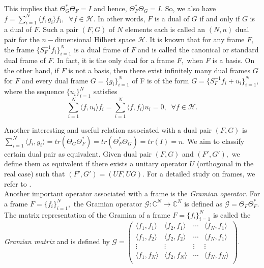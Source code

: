 \documentclass[final,1p,times]{elsarticle}
\begin{document}
	This implies that $\Theta_{G}^* \Theta_{F} = I$ and hence, $\Theta_{F}^* \Theta_{G} = I.$ So, we also have $	f = \sum_{i=1}^N\langle f,g_i \rangle f_i,  \;\;   \forall f\in \mathcal{H}.$ In other words, $F$ is a dual of $G$ if and only if $G$ is a dual of $F.$ Such a pair $(F,G)$  of $N$ elements each is called an $(N,n)$ dual pair for the $n-$dimensional Hilbert space $\mathcal{H}.$ It is known that for any frame $F,$ the frame $\{S_{F}^{-1}f_i\}_{i=1}^{N}$ is  a dual frame of $F$ and is called the canonical or standard dual frame of $F$. In fact, it is the only dual for a frame $F,$ when $F$ is a basis.  On the other hand, if $F$ is not a basis, then  there exist infinitely many dual frames  $G$ for $F$ and every dual frame $G=\{g_i\}_{i=1}^N$ of F is of the form $G=\{S_{F}^{-1}f_i +u_i\}_{i=1}^N,$ where the sequence $\{u_i\}_{i=1}^N$ satisfies $$\sum_{i=1}^N \langle f,u_i \rangle f_i = \sum_{i=1}^N \langle f,f_i \rangle u_i  = 0, \;\;   \forall f\in \mathcal{H}.$$
	
	\noindent
	Another interesting and useful relation associated with a dual pair $(F,G)$ is 
	$\displaystyle{\sum_{i=1}^N\langle f_i,g_i \rangle} = tr(\Theta_G \Theta_{F}^*)= tr (\Theta_{F}^* \Theta_G)=  tr(I)=n.$ We aim to classify certain dual pair as equivalent. Given dual pair $(F,G)$ and $(F',G'),$ we define them as equivalent if there exists a unitary operator $U$ (orthogonal in the real case) such that $(F',G') = (UF,UG).$	For a detailed study on frames, we refer to \cite{ole}. \\
	Another important operator associated with a frame is the \textit{Gramian operator}. For a frame $F= \{f_i\}_{i=1}^N,$ the Gramian operator $\mathcal{G}: \mathbb{C}^N \to  \mathbb{C}^N $ is defined as $\mathcal{G} = \Theta_{F} \Theta_{F}^*.$ The matrix representation of the Gramian of a frame $F= \{f_i\}_{i=1}^N$ is called the \textit{Gramian matrix} and is defined by $\mathcal{G}= \begin{pmatrix}
		\langle f_1,f_1 \rangle & \langle f_2,f_1 \rangle  & \cdots  &\langle f_N,f_1 \rangle\\
		\langle f_1,f_2 \rangle & \langle f_2,f_2 \rangle  & \cdots  &\langle f_N,f_1 \rangle \\
		\vdots &\vdots  &\vdots &\vdots  \\
		\langle f_1,f_N \rangle & \langle f_2,f_N \rangle  & \cdots  &  \langle f_N,f_N \rangle \\
		
	\end{pmatrix}.$\\~\\
\end{document}
